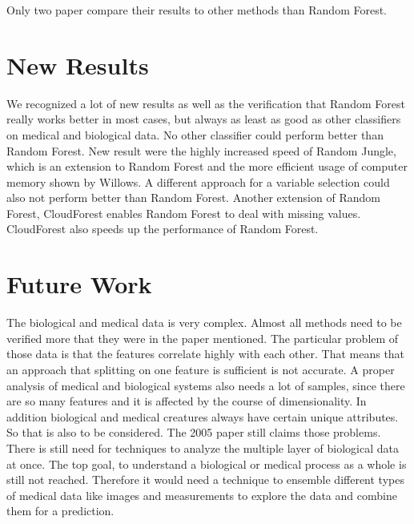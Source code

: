 \documentclass{sig-alternate-05-2015}
\begin{document}
Only two paper compare their results to other methods than Random Forest. 

\section{New Results}
We recognized a lot of new results as well as the verification that Random Forest really works better in most cases, but always as least as good as other classifiers on medical and biological data. No other classifier could perform better than Random Forest. New result were the highly increased speed of Random Jungle, which is an extension to Random Forest and the more efficient usage of computer memory shown by Willows. A different approach for a variable selection could also not perform better than Random Forest.  Another extension of Random Forest, CloudForest enables Random Forest to deal with missing values. CloudForest also speeds up the performance of Random Forest.


\section{Future Work}
The biological and medical data is very complex. Almost all methods need to be verified more that they were in the paper mentioned. The particular problem of those data is that the features correlate highly with each other. That means that an approach that splitting on one feature is sufficient is not accurate. A proper analysis of medical and biological systems also needs a lot of samples, since there are so many features and it is affected by the course of dimensionality. In addition biological and medical creatures always have certain unique attributes. So that is also to be considered.
The 2005 paper \cite{Sturm:2015:DMK:2853955.2853965} still claims those problems. There is still need for techniques to analyze the multiple layer of biological data at once.  The top goal, to understand a biological or medical process as a whole is still not reached. Therefore it would need a technique to ensemble different types of medical data like images and measurements to explore the data and combine them for a prediction. 





%

%
%

\end{document}
